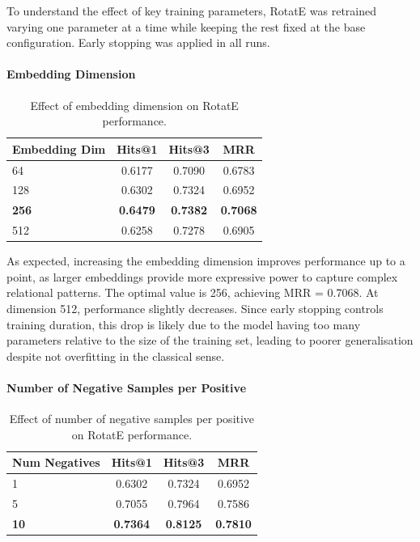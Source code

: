 \documentclass{article}
\begin{document}
  To understand the effect of key training parameters, RotatE was retrained varying
  one parameter at a time while keeping the rest fixed at the base configuration.
  Early stopping was applied in all runs.

  \paragraph{Embedding Dimension}

  \begin{table}[h]
  \centering
  \begin{tabular}{lccc}
  \hline
  \textbf{Embedding Dim} & \textbf{Hits@1} & \textbf{Hits@3} & \textbf{MRR} \\
  \hline
  64  & 0.6177 & 0.7090 & 0.6783 \\
  128 & 0.6302 & 0.7324 & 0.6952 \\
  \textbf{256} & \textbf{0.6479} & \textbf{0.7382} & \textbf{0.7068} \\
  512 & 0.6258 & 0.7278 & 0.6905 \\
  \hline
  \end{tabular}
  \caption{Effect of embedding dimension on RotatE performance.}
  \end{table}

  As expected, increasing the embedding dimension improves performance up to a point,
  as larger embeddings provide more expressive power to capture complex relational
  patterns. The optimal value is 256, achieving MRR = 0.7068. At dimension 512,
  performance slightly decreases. Since early stopping controls training duration,
  this drop is likely due to the model having too many parameters relative to the
  size of the training set, leading to poorer generalisation despite not overfitting
  in the classical sense.

  \paragraph{Number of Negative Samples per Positive}

  \begin{table}[h]
  \centering
  \begin{tabular}{lccc}
  \hline
  \textbf{Num Negatives} & \textbf{Hits@1} & \textbf{Hits@3} & \textbf{MRR} \\
  \hline
  1  & 0.6302 & 0.7324 & 0.6952 \\
  5  & 0.7055 & 0.7964 & 0.7586 \\
  \textbf{10} & \textbf{0.7364} & \textbf{0.8125} & \textbf{0.7810} \\
  \hline
  \end{tabular}
  \caption{Effect of number of negative samples per positive on RotatE performance.}
  \end{table}
\end{document}
